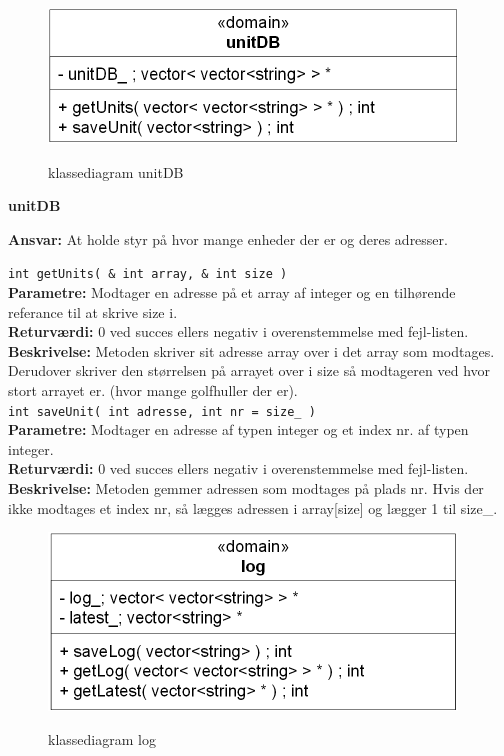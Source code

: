 \newpage

\begin{figure}[htbp] \centering
{\includegraphics[scale=1.5]{filer/design/Klassediagrammer/sw_unitDB}}
\caption{klassediagram unitDB}
\label{fig:unitDB klassediagram}
\end{figure} 

{\centering
\textbf{unitDB}\par
}
\textbf{Ansvar:} At holde styr på hvor mange enheder der er og deres adresser. \

\verb+int getUnits( & int array, & int size ) +\\
\textbf{Parametre:} Modtager en adresse på et array af integer og en tilhørende referance til at skrive size i.\\
\textbf{Returværdi:} 0 ved succes ellers negativ i overenstemmelse med fejl-listen. \\
\textbf{Beskrivelse:} Metoden skriver sit adresse array over i det array som modtages. Derudover skriver den størrelsen på arrayet over i size så modtageren ved hvor stort arrayet er. (hvor mange golfhuller der er).\\

\verb+int saveUnit( int adresse, int nr = size_ ) +\\
\textbf{Parametre:} Modtager en adresse af typen integer og et index nr. af typen integer. \\
\textbf{Returværdi:} 0 ved succes ellers negativ i overenstemmelse med fejl-listen. \\
\textbf{Beskrivelse:}  Metoden gemmer adressen som modtages på plads nr. Hvis der ikke modtages et index nr, så lægges adressen i array[size] og lægger 1 til size\_. \\


\newpage
\begin{figure}[htbp] \centering
{\includegraphics[scale=1.5]{filer/design/Klassediagrammer/sw_log}}
\caption{klassediagram log}
\label{fig:log klassediagram}
\end{figure} 

